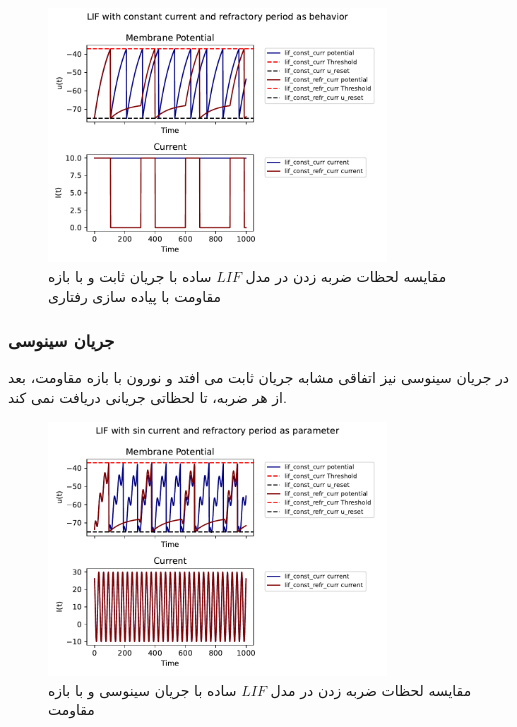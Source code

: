 \documentclass{article}
\begin{document}
                \begin{figure}[H]
                    \centering
                    \includegraphics[width=0.8\textwidth]{plots/LIF with constant current and refractory period as behavior.pdf} 
                    \caption{مقایسه لحظات ضربه زدن در مدل $LIF$ ساده با جریان ثابت و با بازه مقاومت با پیاده سازی رفتاری}
                \end{figure}
            \subsubsection{جریان سینوسی}
                در جریان سینوسی نیز اتفاقی مشابه جریان ثابت می افتد و نورون با بازه مقاومت، بعد از هر ضربه، تا لحظاتی جریانی دریافت نمی کند.
                \begin{figure}[H]
                    \centering
                    \includegraphics[width=0.8\textwidth]{plots/LIF with sin current and refractory period as parameter.pdf} 
                    \caption{مقایسه لحظات ضربه زدن در مدل $LIF$ ساده با جریان سینوسی و با بازه مقاومت}
                    \label{fig:lif-sin-curr-refractory}
                \end{figure}
\end{document}
